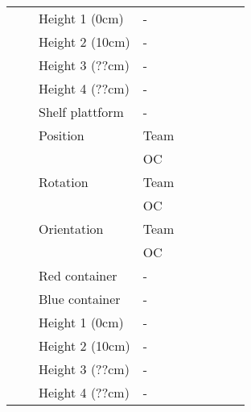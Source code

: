 \begin{table}[h!]
\begin{tabular}{l|l|l|l*{5}{|P{1cm}}|}
     & 
         & Height 1 (0cm)        & -        &            &           &          &           &         \\
      &  & Height 2 (10cm)       & -        &            &   \Y      &          &           &         \\
      &  & Height 3 (??cm)       & -        &            &           &          &           &         \\
      &  & Height 4 (??cm)       & -        &            &           &          &           &         \\
      &  & Shelf plattform       & -        &            &           &          &           &         \\
      &  & Position              & Team     &            &   \Y      &          &           &         \\
      &  &                       & OC       &            &           &          &           &         \\
	    &  & Rotation              & Team     &            &           &          &           &         \\
      &  &                       & OC       &            &           &          &           &         \\
	    &  & Orientation           & Team     &            &           &          &           &         \\
      &  &                       & OC       &            &           &          &           &         \\
      &  & Red container         & -        &            &           &          &           &         \\
      &  & Blue container        & -        &            &           &          &           &         \\
      \hhline{~--------}
      & 
          & Height 1 (0cm)       & -        &            &           &          &           &         \\
      &  & Height 2 (10cm)       & -        &    \Y      &           &          &           &         \\
      &  & Height 3 (??cm)       & -        &            &           &          &           &         \\
      &  & Height 4 (??cm)       & -        &            &           &          &           &         \\

\end{tabular}
\end{table}
